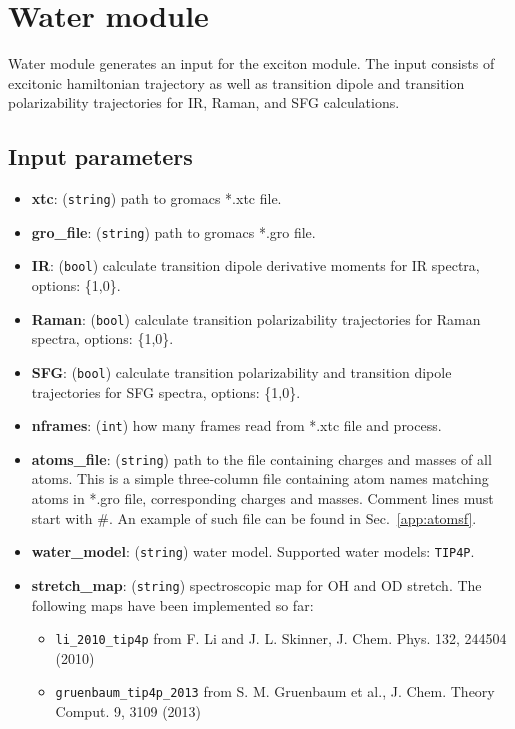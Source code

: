 \documentclass{article}
\begin{document}
\section{Water module}
Water module generates an input for the exciton module. The input consists of excitonic hamiltonian trajectory as well as 
transition dipole and transition polarizability trajectories for IR, Raman, and SFG calculations.

\subsection{Input parameters}

\begin{itemize}

\item \textbf{xtc}: (\texttt{string}) path to gromacs *.xtc file.
\item \textbf{gro\_file}: (\texttt{string}) path to gromacs *.gro file.
\item \textbf{IR}: (\texttt{bool}) calculate transition dipole derivative moments for IR spectra, options: \{1,0\}.
\item \textbf{Raman}: (\texttt{bool}) calculate transition polarizability trajectories for Raman spectra, options: \{1,0\}.
\item \textbf{SFG}: (\texttt{bool}) calculate transition polarizability and transition dipole trajectories for SFG spectra, options: \{1,0\}.
\item \textbf{nframes}: (\texttt{int}) how many frames read from *.xtc file and process.
\item \textbf{atoms\_file}: (\texttt{string}) path to the file containing charges and masses of all atoms. This is a simple three-column file containing atom names matching atoms in 
*.gro file, corresponding charges and masses. Comment lines must start with \textsc{\#}. An example of such file can be found in Sec.~\ref{app:atomsf}.
\item \textbf{water\_model}: (\texttt{string}) water model. Supported water models: \texttt{TIP4P}.
\item \textbf{stretch\_map}: (\texttt{string}) spectroscopic map for OH and OD stretch. The following maps have been implemented so far:
\begin{itemize}
\item \texttt{li\_2010\_tip4p} from F. Li and J. L. Skinner, J. Chem. Phys. 132, 244504 (2010) 
\item  \texttt{gruenbaum\_tip4p\_2013} from S. M. Gruenbaum et al., J. Chem. Theory Comput. 9, 3109 (2013)
\end{itemize}


\end{itemize}
\end{document}
